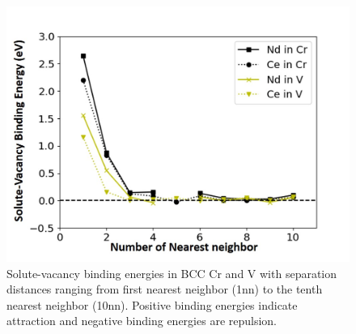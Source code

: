 \documentclass[preprint,12pt]{elsarticle}
\begin{document}
\begin{figure}
    \centering
    \includegraphics[width=0.9\linewidth]{BE_cr_v.jpg}
    \caption{Solute-vacancy binding energies in BCC Cr and V with separation distances ranging from first nearest neighbor (1nn) to the tenth nearest neighbor (10nn). Positive binding energies indicate attraction and negative binding energies are repulsion.}
    \label{fig:binding_energies_cr_v}
\end{figure}
\end{document}
